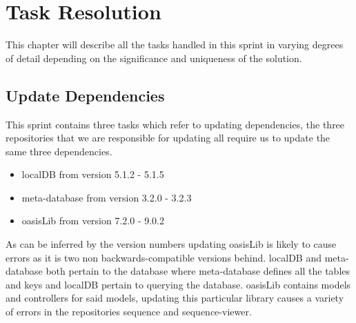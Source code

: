 \chapter{Task Resolution}
This chapter will describe all the tasks handled in this sprint in varying degrees of detail depending on the significance and uniqueness of the solution.

\section{Update Dependencies}

This sprint contains three tasks which refer to updating dependencies, the three repositories that we are responsible for updating all require us to update the same three dependencies.
\begin{itemize}
    \item localDB from version 5.1.2 - 5.1.5
    \item meta-database from version 3.2.0 - 3.2.3
    \item oasisLib from version 7.2.0 - 9.0.2
\end{itemize}
As can be inferred by the version numbers updating oasisLib is likely to cause errors as it is two non backwards-compatible versions behind.
localDB and meta-database both pertain to the database where meta-database defines all the tables and keys and localDB pertain to querying the database. 
oasisLib contains models and controllers for said models, updating this particular library causes a variety of errors in the repositories sequence and sequence-viewer.

